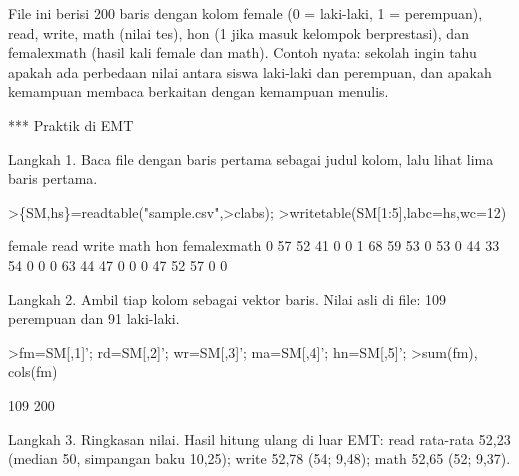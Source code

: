 \documentclass[a4paper,10pt]{article}
\begin{document}
\begin{eulernotebook}
\begin{eulercomment}
\begin{eulercomment}
\begin{eulercomment}
\begin{eulercomment}
\begin{eulercomment}
\begin{eulercomment}
\begin{eulercomment}
\begin{eulercomment}
\begin{eulercomment}
\begin{eulercomment}
\begin{eulercomment}
\begin{eulercomment}
\begin{eulercomment}
\begin{eulercomment}
\begin{eulercomment}
\begin{eulercomment}
\begin{eulercomment}
\begin{eulercomment}
\begin{eulercomment}
\begin{eulercomment}
\begin{eulercomment}
\begin{eulercomment}
\begin{eulercomment}
\begin{eulercomment}
\begin{eulercomment}
\begin{eulercomment}
\begin{eulercomment}
\begin{eulercomment}
\begin{eulercomment}
File ini berisi 200 baris dengan kolom female (0 = laki-laki, 1 = perempuan), read, write,
math (nilai tes), hon (1 jika masuk kelompok berprestasi), dan femalexmath (hasil kali
female dan math). Contoh nyata: sekolah ingin tahu apakah ada perbedaan nilai antara siswa
laki-laki dan perempuan, dan apakah kemampuan membaca berkaitan dengan kemampuan menulis.

*** Praktik di EMT

Langkah 1. Baca file dengan baris pertama sebagai judul kolom, lalu lihat lima baris pertama.
\end{eulercomment}
\begin{eulerprompt}
>\{SM,hs\}=readtable("sample.csv",>clabs);
>writetable(SM[1:5],labc=hs,wc=12)
\end{eulerprompt}
\begin{euleroutput}
        female        read       write        math         hon femalexmath
             0          57          52          41           0           0
             1          68          59          53           0          53
             0          44          33          54           0           0
             0          63          44          47           0           0
             0          47          52          57           0           0
\end{euleroutput}
\begin{eulercomment}
Langkah 2. Ambil tiap kolom sebagai vektor baris. Nilai asli di file: 109 perempuan dan 91
laki-laki.
\end{eulercomment}
\begin{eulerprompt}
>fm=SM[,1]'; rd=SM[,2]'; wr=SM[,3]'; ma=SM[,4]'; hn=SM[,5]';
>sum(fm), cols(fm)
\end{eulerprompt}
\begin{euleroutput}
  109
  200
\end{euleroutput}
\begin{eulercomment}
Langkah 3. Ringkasan nilai. Hasil hitung ulang di luar EMT: read rata-rata 52,23 (median 50,
simpangan baku 10,25); write 52,78 (54; 9,48); math 52,65 (52; 9,37).
\end{eulercomment}

\end{eulercomment}
\end{eulercomment}
\end{eulercomment}
\end{eulercomment}
\end{eulercomment}
\end{eulercomment}
\end{eulercomment}
\end{eulercomment}
\end{eulercomment}
\end{eulercomment}
\end{eulercomment}
\end{eulercomment}
\end{eulercomment}
\end{eulercomment}
\end{eulercomment}
\end{eulercomment}
\end{eulercomment}
\end{eulercomment}
\end{eulercomment}
\end{eulercomment}
\end{eulercomment}
\end{eulercomment}
\end{eulercomment}
\end{eulercomment}
\end{eulercomment}
\end{eulercomment}
\end{eulercomment}
\end{eulercomment}
\end{eulernotebook}
\end{document}
